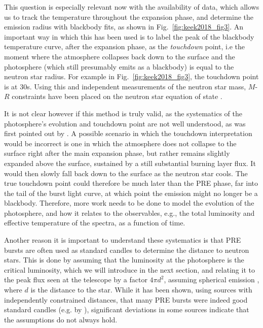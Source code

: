 \documentclass[../main.tex]{subfiles}
\begin{document}
This question is especially relevant now with the availability of \Nicer {} data, which allows us to track the temperature throughout the expansion phase, and determine the emission radius with blackbody fits, as shown in Fig.~\ref{fig:keek2018_fig3}. An important way in which this has been used is to label the peak of the blackbody temperature curve, after the expansion phase, as the \textit{touchdown} point, i.e the moment where the atmosphere collapses back down to the surface and the photosphere (which still presumably emits as a blackbody) is equal to the neutron star radius. For example in Fig.~\ref{fig:keek2018_fig3}, the touchdown point is at 30s. Using this and independent measurements of the neutron star mass, $M$-$R$ constraints have been placed on the neutron star equation of state \citep{Ozel2016a}.  

It is not clear however if this method is truly valid, as the systematics of the photosphere's evolution and touchdown point are not well understood, as was first pointed out by \citet{Steiner2010}. A possible scenario in which the touchdown interpretation would be incorrect is one in which the atmosphere does not collapse to the surface right after the main expansion phase, but rather remains slightly expanded above the surface, sustained by a still substantial burning layer flux. It would then slowly fall back down to the surface as the neutron star cools. The true touchdown point could therefore be much later than the PRE phase, far into the tail of the burst light curve, at which point the emission might no longer be a blackbody. Therefore, more work needs to be done to model the evolution of the photosphere, and how it relates to the observables, e.g., the total luminosity and effective temperature of the spectra, as a function of time. 

Another reason it is important to understand these systematics is that PRE bursts are often used as standard candles to determine the distance to neutron stars. This is done by assuming that the luminosity at the photosphere is the critical luminosity, which we will introduce in the next section, and relating it to the peak flux seen at the telescope by a factor $4\pi d^2$, assuming spherical emission \citep{Galloway2008}, where $d$ is the distance to the star. While it has been shown, using sources with independently constrained distances, that many PRE bursts were indeed good standard candles (e.g. by \citet{Kuulkers2003}), significant deviations in some sources indicate that the assumptions do not always hold.
\end{document}
